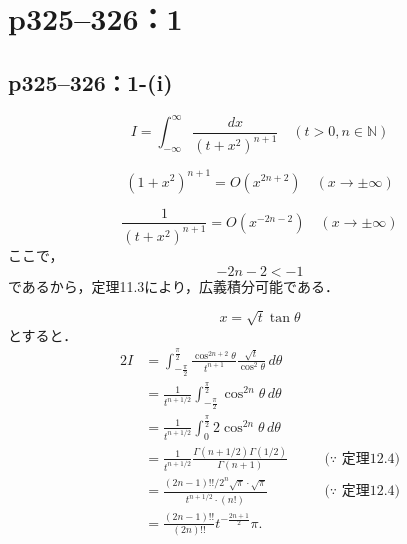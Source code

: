 \documentclass[a4paper,10pt,fleqn]{ltjsarticle}
\begin{document}

\newpage


\section*{p325--326：1}


\subsection*{p325--326：1-(i)}

\begin{tleftbar}
    \[
        I = \int_{-\infty}^{\infty} \frac{dx}{(t+x^2)^{n+1}} \quad (t > 0, n \in \mathbb{N})
    \]

    \[
        (1+x^2)^{n+1} = O(x^{2n+2}) \quad (x \to \pm \infty)
    \]

    \[
        \frac{1}{(t+x^2)^{n+1}} = O(x^{-2n-2}) \quad (x \to \pm \infty)
    \]
    ここで，
    \[
        -2n-2 < -1
    \]
    であるから，定理11.3により，広義積分可能である．

    \[
        x = \sqrt{t} \tan \theta
    \]
    とすると．
    \begin{alignat*}{2}
        I & = \int_{-\frac{\pi}{2}}^{\frac{\pi}{2}} \frac{\cos^{2n+2} \theta}{t^{n+1} } \frac{\sqrt{t}}{\cos^2 \theta} \, d \theta &       &                            \\
          & = \frac{1}{t^{n+1/2}} \int_{-\frac{\pi}{2}}^{\frac{\pi}{2}} \cos^{2n} \theta \, d\theta                                &       &                            \\
          & = \frac{1}{t^{n+1/2}} \int_{0}^{\frac{\pi}{2}} 2 \cos^{2n} \theta \, d\theta                                           &       &                            \\
          & = \frac{1}{t^{n+1/2}} \frac{\Gamma (n+1/2) \Gamma (1/2)}{\Gamma(n+1)}                                                  & \quad & \text{($\because$~定理12.4)} \\
          & = \frac{(2n-1)!! / 2^n \sqrt{\pi} \cdot \sqrt{\pi}}{t^{n+1/2} \cdot (n!)}                                              & \quad & \text{($\because$~定理12.4)} \\\
          & = \frac{(2n-1)!!}{(2n)!!} t^{ - \frac{2n+1}{2}} \pi .
    \end{alignat*}
\end{tleftbar}
\end{document}
